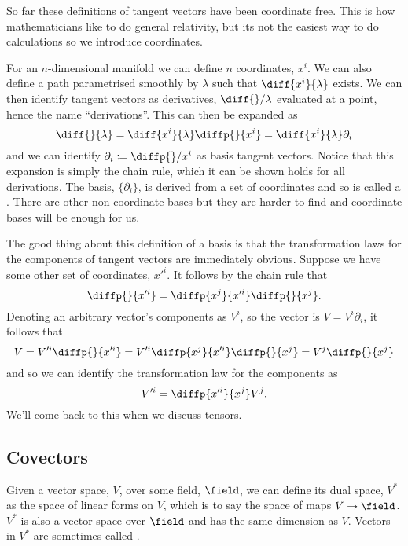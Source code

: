 \documentclass[fleqn]{NotesClass}
\begin{document}
    So far these definitions of tangent vectors have been coordinate free.
    This is how mathematicians like to do general relativity, but its not the easiest way to do calculations so we introduce coordinates.
    
    For an \(n\)-dimensional manifold we can define \(n\) coordinates, \(x^i\).
    We can also define a path parametrised smoothly by \(\lambda\) such that \(\diff{x^i}{\lambda}\) exists.
    We can then identify tangent vectors as derivatives, \(\diff{}/{\lambda}\) evaluated at a point, hence the name \enquote{derivations}.
    This can then be expanded as
    \begin{equation}
        \diff{}{\lambda} = \diff{x^i}{\lambda} \diffp{}{x^i} = \diff{x^i}{\lambda}\partial_i
    \end{equation}
    and we can identify \(\partial_i \coloneqq \diffp{}/{x^i}\) as basis tangent vectors.
    Notice that this expansion is simply the chain rule, which it can be shown holds for all derivations.
    The basis, \(\{\partial_i\}\), is derived from a set of coordinates and so is called a .
    There are other non-coordinate bases but they are harder to find and coordinate bases will be enough for us.
    
    The good thing about this definition of a basis is that the transformation laws for the components of tangent vectors are immediately obvious.
    Suppose we have some other set of coordinates, \(x'^i\).
    It follows by the chain rule that
    \begin{equation}
        \diffp{}{x'^i} = \diffp{x^j}{x'^i}\diffp{}{x^j}.
    \end{equation}
    Denoting an arbitrary vector's components as \(V^i\), so the vector is \(V = V^i\partial_i\), it follows that
    \begin{equation}
        V = V'^i\diffp{}{x'^i} = V'^i \diffp{x^j}{x'^i}\diffp{}{x^j} = V^j \diffp{}{x^j}
    \end{equation}
    and so we can identify the transformation law for the components as
    \begin{equation}
        V'^i = \diffp{x'^i}{x^j}V^j.
    \end{equation}
    We'll come back to this when we discuss tensors.
    
    \subsection{Covectors}
    Given a vector space, \(V\), over some field, \(\field\), we can define its dual space, \(V^*\) as the space of linear forms on \(V\), which is to say the space of maps \(V \to \field\).
    \(V^*\) is also a vector space over \(\field\) and has the same dimension as \(V\).
    Vectors in \(V^*\) are sometimes called .
    
\end{document}
